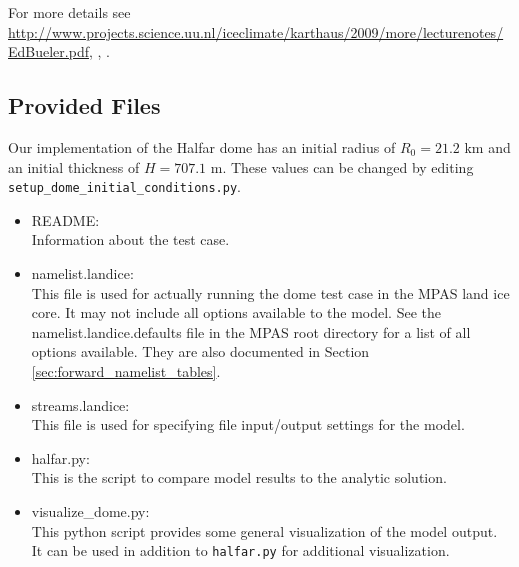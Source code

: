 For more details see \url{http://www.projects.science.uu.nl/iceclimate/karthaus/2009/more/lecturenotes/EdBueler.pdf},  \citet{Bueler2005}, \citet{Halfar1983}.



\subsection{Provided Files}
\label{subsec:halfar_files}
Our implementation of the Halfar dome has an initial radius of $R_0=21.2$ km and an initial thickness of $H=707.1$ m.
These values can be changed by editing \texttt{setup\_dome\_initial\_conditions.py}.

\begin{itemize}
	\item README: \\
		Information about the test case.

	\item namelist.landice: \\
		This file is used for actually running the dome test case in the MPAS land ice core.  It may not include all options available to the model.  See the namelist.landice.defaults file in the MPAS root directory for a list of all options available.  They are also documented in Section \ref{sec:forward_namelist_tables}.

	\item streams.landice: \\
		This file is used for specifying file input/output settings for the model.

	\item halfar.py: \\
		This is the script to compare model results to the analytic solution.

	\item visualize\_dome.py: \\
		This python script provides some general visualization of the model output.
		It can be used in addition to \texttt{halfar.py} for additional visualization.



\end{itemize}
